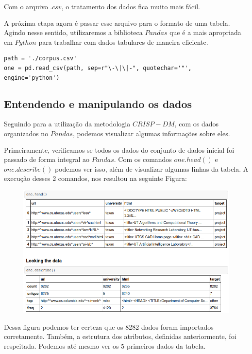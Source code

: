 \documentclass [12pt, a4paper] {article}
\begin{document}
Com o arquivo $.csv$, o tratamento dos dados fica muito mais fácil. 

A próxima etapa agora é passar esse arquivo para o formato de uma tabela. Agindo nesse sentido, utilizaremos a biblioteca $Pandas$ que é a mais apropriada em $Python$ para trabalhar com dados tabulares de maneira eficiente. 


\begin{lstlisting}
path = './corpus.csv'
one = pd.read_csv(path, sep=r"\-\|\|-", quotechar='"', engine='python')
\end{lstlisting}
\newpage


\subsection{Entendendo e manipulando os dados}

Seguindo para a utilização da metodologia $CRISP-DM$, com os dados organizados no $Pandas$, podemos visualizar algumas informações sobre eles.

Primeiramente, verificamos se todos os dados do conjunto de dados inicial foi passado de forma integral ao $Pandas$. Com os comandos $one.head()$ e $one.describe()$ podemos ver isso, além de visualizar algumas linhas da tabela. A execução desses 2 comandos, nos resultou na seguinte Figura:


\begin{figure}[!hbt]
		\begin{center}
		\includegraphics[width=1\columnwidth]{figuras/1.png}
		\end{center}
\end{figure}

Dessa figura podemos ter certeza que os 8282 dados foram importados corretamente. Também, a estrutura dos atributos, definidas anteriormente, foi respeitada. Podemos até mesmo ver os 5 primeiros dados da tabela.
\end{document}
